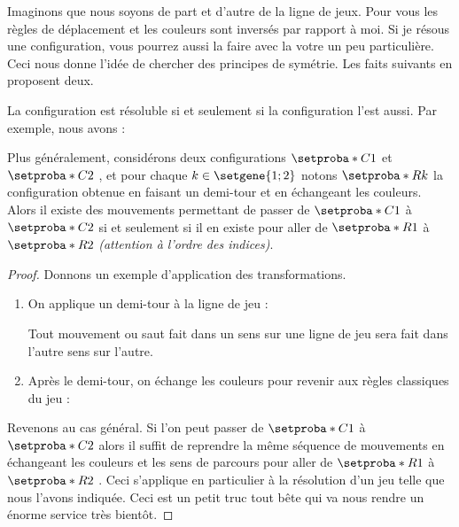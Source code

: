 Imaginons que nous soyons de part et d'autre de la ligne de jeux.
Pour vous les règles de déplacement et les couleurs sont inversés par rapport à moi.
Si je résous une configuration, vous pourrez aussi la faire avec la votre un peu particulière.
Ceci nous donne l'idée de chercher des principes de symétrie. Les faits suivants en proposent deux.



\begin{fact} \label{symmetry-color}
    La configuration  est résoluble si et seulement si la configuration  l'est aussi.
    Par exemple, nous avons :


    \medskip

    Plus généralement, considérons deux configurations $\setproba*{C}{1}$ et $\setproba*{C}{2}$ , et pour chaque $k \in \setgene{1 ; 2}$ notons $\setproba*{R}{k}$ la configuration obtenue en faisant un demi-tour et en échangeant les couleurs.
    Alors il existe des mouvements permettant de passer de $\setproba*{C}{1}$ à $\setproba*{C}{2}$ si et seulement si il en existe pour aller de $\setproba*{R}{1}$ à $\setproba*{R}{2}$ \emph{(attention à l'ordre des indices)}.
\end{fact}


\begin{proof}
    Donnons un exemple d'application des transformations.
    \begin{enumerate}
        \item On applique un demi-tour à la ligne de jeu :

        \noindent
        Tout mouvement ou saut fait dans un sens sur une ligne de jeu sera fait dans l'autre sens sur l'autre.

        \item Après le demi-tour, on échange les couleurs pour revenir aux règles classiques du jeu :
    \end{enumerate}

    Revenons au cas général.
    Si l'on peut passer de $\setproba*{C}{1}$ à $\setproba*{C}{2}$ alors il suffit de reprendre la même séquence de mouvements en échangeant les couleurs et les sens de parcours pour aller de $\setproba*{R}{1}$ à $\setproba*{R}{2}$ .
    Ceci s'applique en particulier à la résolution d'un jeu telle que nous l'avons indiquée.
    Ceci est un petit truc tout bête qui va nous rendre un énorme service très bientôt.
\end{proof}


